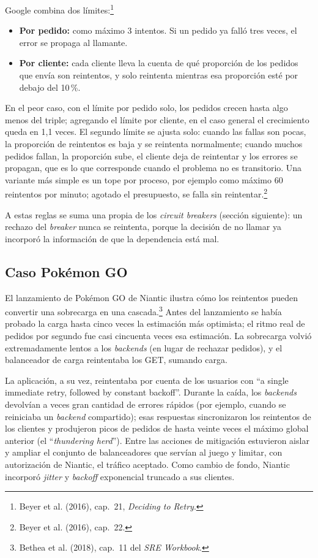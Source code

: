 \documentclass[variant=apuntes,cover=institutional,mode=screen]{ua-engineering-v6-article}
\begin{document}
Google combina dos límites:\footnote{Beyer et al. (2016), cap.~21, \emph{Deciding to Retry}.}
\begin{itemize}
\item \textbf{Por pedido:} como máximo 3 intentos. Si un pedido ya falló tres veces, el error se propaga al llamante.
\item \textbf{Por cliente:} cada cliente lleva la cuenta de qué proporción de los pedidos que envía son reintentos, y solo reintenta mientras esa proporción esté por debajo del 10\,\%.
\end{itemize}
En el peor caso, con el límite por pedido solo, los pedidos crecen hasta algo menos del triple; agregando el límite por cliente, en el caso general el crecimiento queda en 1,1 veces. El segundo límite se ajusta solo: cuando las fallas son pocas, la proporción de reintentos es baja y se reintenta normalmente; cuando muchos pedidos fallan, la proporción sube, el cliente deja de reintentar y los errores se propagan, que es lo que corresponde cuando el problema no es transitorio. Una variante más simple es un tope por proceso, por ejemplo como máximo 60 reintentos por minuto; agotado el presupuesto, se falla sin reintentar.\footnote{Beyer et al. (2016), cap.~22.}

A estas reglas se suma una propia de los \emph{circuit breakers} (sección siguiente): un rechazo del \emph{breaker} nunca se reintenta, porque la decisión de no llamar ya incorporó la información de que la dependencia está mal.

\subsection{Caso Pokémon GO}

El lanzamiento de Pokémon GO de Niantic ilustra cómo los reintentos pueden convertir una sobrecarga en una cascada.\footnote{Bethea et al. (2018), cap.~11 del \emph{SRE Workbook}.} Antes del lanzamiento se había probado la carga hasta cinco veces la estimación más optimista; el ritmo real de pedidos por segundo fue casi cincuenta veces esa estimación. La sobrecarga volvió extremadamente lentos a los \emph{backends} (en lugar de rechazar pedidos), y el balanceador de carga reintentaba los GET, sumando carga.

La aplicación, a su vez, reintentaba por cuenta de los usuarios con ``a single immediate retry, followed by constant backoff''. Durante la caída, los \emph{backends} devolvían a veces gran cantidad de errores rápidos (por ejemplo, cuando se reiniciaba un \emph{backend} compartido); esas respuestas sincronizaron los reintentos de los clientes y produjeron picos de pedidos de hasta veinte veces el máximo global anterior (el ``\emph{thundering herd}''). Entre las acciones de mitigación estuvieron aislar y ampliar el conjunto de balanceadores que servían al juego y limitar, con autorización de Niantic, el tráfico aceptado. Como cambio de fondo, Niantic incorporó \emph{jitter} y \emph{backoff} exponencial truncado a sus clientes.
\end{document}
